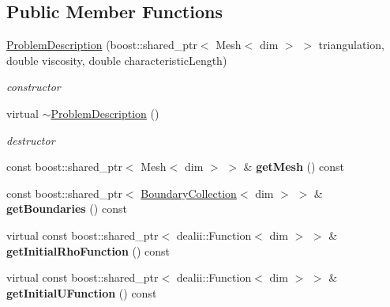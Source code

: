 \subsection*{Public Member Functions}
\begin{DoxyCompactItemize}
\item 
\hyperlink{classnatrium_1_1ProblemDescription_afc92659d0022799b4e846cf050e8efad}{ProblemDescription} (boost::shared\_\-ptr$<$ Mesh$<$ dim $>$ $>$ triangulation, double viscosity, double characteristicLength)
\begin{DoxyCompactList}\small\item\em constructor \item\end{DoxyCompactList}\item 
\hypertarget{classnatrium_1_1ProblemDescription_a5270994970ddbd9f6fc98f292c1ccc0e}{
virtual \hyperlink{classnatrium_1_1ProblemDescription_a5270994970ddbd9f6fc98f292c1ccc0e}{$\sim$ProblemDescription} ()}
\label{classnatrium_1_1ProblemDescription_a5270994970ddbd9f6fc98f292c1ccc0e}

\begin{DoxyCompactList}\small\item\em destructor \item\end{DoxyCompactList}\item 
\hypertarget{classnatrium_1_1ProblemDescription_a16420fffc7d77b22611281b83c80664f}{
const boost::shared\_\-ptr$<$ Mesh$<$ dim $>$ $>$ \& {\bfseries getMesh} () const }
\label{classnatrium_1_1ProblemDescription_a16420fffc7d77b22611281b83c80664f}

\item 
\hypertarget{classnatrium_1_1ProblemDescription_ab42b3f2f0144d269bb38a4019e408209}{
const boost::shared\_\-ptr$<$ \hyperlink{classnatrium_1_1BoundaryCollection}{BoundaryCollection}$<$ dim $>$ $>$ \& {\bfseries getBoundaries} () const }
\label{classnatrium_1_1ProblemDescription_ab42b3f2f0144d269bb38a4019e408209}

\item 
\hypertarget{classnatrium_1_1ProblemDescription_adaf831d77fae721f84c2a915976cb726}{
virtual const boost::shared\_\-ptr$<$ dealii::Function$<$ dim $>$ $>$ \& {\bfseries getInitialRhoFunction} () const }
\label{classnatrium_1_1ProblemDescription_adaf831d77fae721f84c2a915976cb726}

\item 
\hypertarget{classnatrium_1_1ProblemDescription_a008bd19c317f7907229c5cab7a646ea0}{
virtual const boost::shared\_\-ptr$<$ dealii::Function$<$ dim $>$ $>$ \& {\bfseries getInitialUFunction} () const }
\label{classnatrium_1_1ProblemDescription_a008bd19c317f7907229c5cab7a646ea0}


\end{DoxyCompactItemize}
